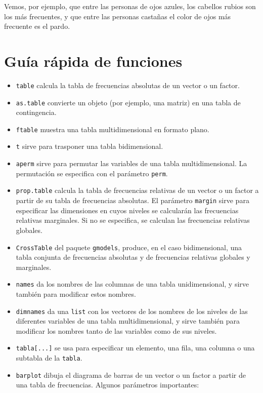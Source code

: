 \documentclass[
]{book}
\providecommand{\tightlist}{%
  \setlength{\itemsep}{0pt}\setlength{\parskip}{0pt}}
\theoremstyle{definition}
\theoremstyle{definition}
\theoremstyle{definition}
\theoremstyle{remark}
\begin{document}
Vemos, por ejemplo, que entre las personas de ojos azules, los cabellos rubios son los más frecuentes, y que entre las personas castañas el color de ojos más frecuente es el pardo.

\hypertarget{guuxeda-ruxe1pida-de-funciones-4}{%
\section{Guía rápida de funciones}\label{guuxeda-ruxe1pida-de-funciones-4}}

\begin{itemize}
\tightlist
\item
  \texttt{table} calcula la tabla de frecuencias absolutas de un vector o un factor.
\item
  \texttt{as.table} convierte un objeto (por ejemplo, una matriz) en una tabla de contingencia.
\item
  \texttt{ftable} muestra una tabla multidimensional en formato plano.
\item
  \texttt{t} sirve para trasponer una tabla bidimensional.
\item
  \texttt{aperm} sirve para permutar las variables de una tabla multidimensional. La permutación se especifica con el parámetro \texttt{perm}.
\item
  \texttt{prop.table} calcula la tabla de frecuencias relativas de un vector o un factor a partir de su tabla de frecuencias absolutas. El parámetro \texttt{margin} sirve para especificar las dimensiones en cuyos niveles se calcularán las frecuencias relativas marginales. Si no se especifica, se calculan las frecuencias relativas globales.
\item
  \texttt{CrossTable} del paquete \texttt{gmodels}, produce, en el caso bidimensional, una tabla conjunta de frecuencias absolutas y de frecuencias relativas globales y marginales.
\item
  \texttt{names} da los nombres de las columnas de una tabla unidimensional, y sirve también para modificar estos nombres.
\item
  \texttt{dimnames} da una \texttt{list} con los vectores de los nombres de los niveles de las diferentes variables de una tabla multidimensional, y sirve también para modificar los nombres tanto de las variables como de sus niveles.
\item
  \texttt{tabla{[}...{]}} se usa para especificar un elemento, una fila, una columna o una subtabla de la \texttt{tabla}.
\item
  \texttt{barplot} dibuja el diagrama de barras de un vector o un factor a partir de una tabla de frecuencias. Algunos parámetros importantes:


\end{itemize}
\end{document}
